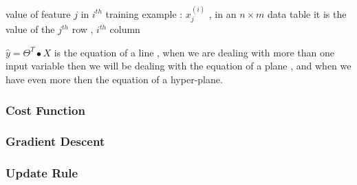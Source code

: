 value of feature $j$ in $i^{th}$ training example : $ x_{j}^{(i)} $ , in an $ n
\times m$ data table it is the value of the $j^{th}$ row , $i^{th}$ column

$ \hat{y}  = \Theta^{T} \bullet X $ is the equation of a line , when we are
dealing with more than one input variable then we will be dealing with the
equation of a plane , and when we have even more then the equation of a
hyper-plane.


\subsubsectionend
\subsubsection{Cost Function}
\label{sssec:cost_function}



\subsubsectionend
\subsubsection{Gradient Descent}
\label{sssec:gradient_descent}



\subsubsectionend
\subsubsection{Update Rule}
\label{sssec:update_rule}



\subsubsectionend

\subsectionend




